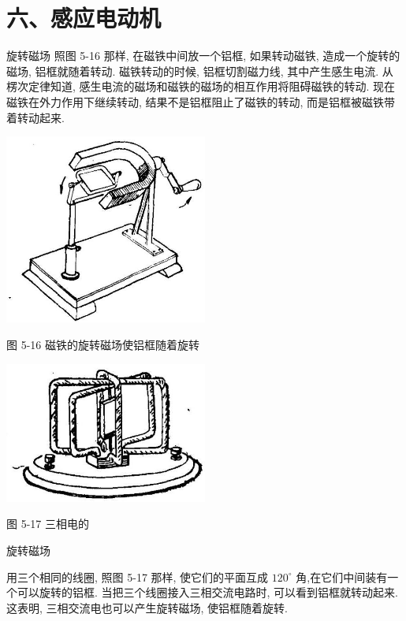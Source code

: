 \documentclass[10pt]{article}
\begin{document}
\section*{六、感应电动机}

旋转磁场 照图 5-16 那样, 在磁铁中间放一个铝框, 如果转动磁铁, 造成一个旋转的磁场, 铝框就随着转动. 磁铁转动的时候, 铝框切割磁力线, 其中产生感生电流. 从楞次定律知道, 感生电流的磁场和磁铁的磁场的相互作用将阻碍磁铁的转动. 现在磁铁在外力作用下继续转动, 结果不是铝框阻止了磁铁的转动, 而是铝框被磁铁带着转动起来.

\begin{center}
\includegraphics[max width=0.5\textwidth]{images/01913056-1f15-74d8-9184-9aab52c9d66b_176_795948.jpg}
\end{center}

图 5-16 磁铁的旋转磁场使铝框随着旋转

\begin{center}
\includegraphics[max width=0.5\textwidth]{images/01913056-1f15-74d8-9184-9aab52c9d66b_176_183544.jpg}
\end{center}

图 5-17 三相电的

旋转磁场

用三个相同的线圈, 照图 5-17 那样, 使它们的平面互成 \({120}^{ \circ }\) 角,在它们中间装有一个可以旋转的铝框. 当把三个线圈接入三相交流电路时, 可以看到铝框就转动起来. 这表明, 三相交流电也可以产生旋转磁场, 使铝框随着旋转.
\end{document}
